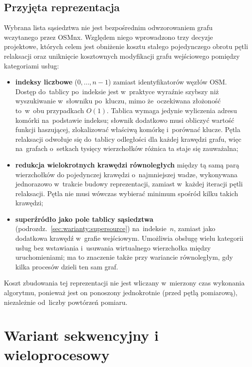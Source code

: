 \subsection{Przyjęta reprezentacja}
\label{subsec:impl:reprezentacja:przyjeta}

Wybrana lista sąsiedztwa nie jest bezpośrednim odwzorowaniem grafu wczytanego przez OSMnx.
Względem niego wprowadzono trzy decyzje projektowe, których celem jest obniżenie kosztu
stałego pojedynczego obrotu pętli relaksacji oraz uniknięcie kosztownych modyfikacji grafu
wejściowego pomiędzy kategoriami usług:

\begin{itemize}
  \item \textbf{indeksy liczbowe} ($0,\dots,n-1$) zamiast identyfikatorów węzłów OSM.
        Dostęp do~tablicy po~indeksie jest w~praktyce wyraźnie szybszy niż wyszukiwanie
        w~słowniku po~kluczu, mimo że~oczekiwana złożoność to~w~obu przypadkach $O(1)$.
        Tablica wymaga jedynie wyliczenia adresu komórki na~podstawie indeksu;
        słownik dodatkowo musi obliczyć wartość funkcji haszującej, zlokalizować właściwą
        komórkę i~porównać klucze. Pętla relaksacji odwołuje się do~tablicy odległości
        dla każdej krawędzi grafu, więc na~grafach o~setkach tysięcy wierzchołków różnica
        ta staje się zauważalna;
  \item \textbf{redukcja wielokrotnych krawędzi równoległych} między tą samą parą wierzchołków
        do pojedynczej krawędzi o~najmniejszej wadze, wykonywana jednorazowo w~trakcie budowy
        reprezentacji, zamiast w~każdej iteracji pętli relaksacji. Pętla nie musi wówczas
        wybierać minimum spośród kilku takich krawędzi;
  \item \textbf{superźródło jako pole tablicy sąsiedztwa} (podrozdz.~\ref{sec:warianty:supersource})
        na~indeksie~$n$, zamiast jako dodatkowa krawędź w~grafie wejściowym.
        Umożliwia obsługę wielu kategorii usług bez wstawiania
        i~usuwania wirtualnego wierzchołka między uruchomieniami; ma to znaczenie
        także przy wariancie równoległym, gdy kilka procesów dzieli ten sam graf.
\end{itemize}

Koszt zbudowania tej reprezentacji nie jest wliczany w~mierzony czas wykonania algorytmu,
ponieważ jest on ponoszony jednokrotnie (przed pętlą pomiarową), niezależnie od~liczby
powtórzeń pomiaru.

\clearpage

\section{Wariant sekwencyjny i wieloprocesowy}
\label{sec:impl:wykonanie}

